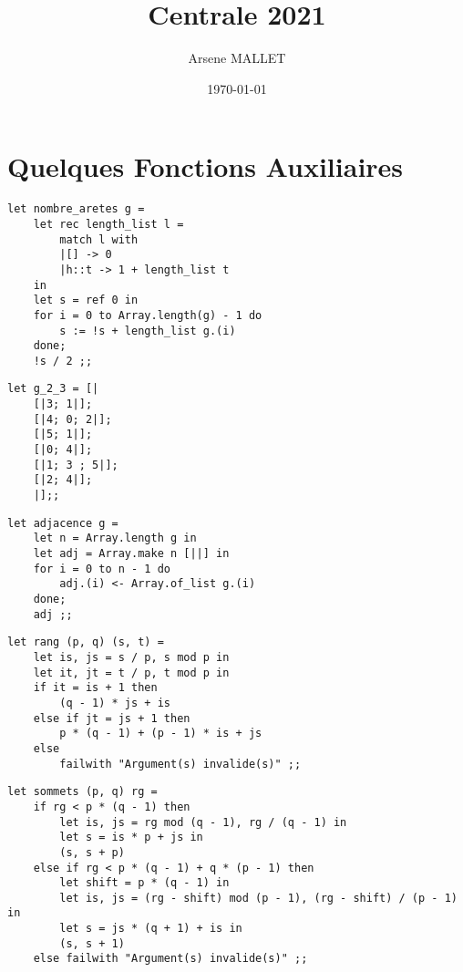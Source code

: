 \documentclass{article}
\title{Centrale 2021}
\date{\today}
\author{Arsene MALLET}
\begin{document}
\thispagestyle{firstpage}

\begin{center}
    \huge\bfseries{\@title}
\end{center}

\section{Quelques Fonctions Auxiliaires}

\begin{question}
    \item \begin{verbatim}
let nombre_aretes g =
    let rec length_list l =
        match l with
        |[] -> 0
        |h::t -> 1 + length_list t 
    in
    let s = ref 0 in
    for i = 0 to Array.length(g) - 1 do
        s := !s + length_list g.(i)
    done;
    !s / 2 ;;
    \end{verbatim}

    \item \begin{verbatim}
let g_2_3 = [|
    [|3; 1|];
    [|4; 0; 2|];
    [|5; 1|];
    [|0; 4|];
    [|1; 3 ; 5|];
    [|2; 4|];
    |];;
    \end{verbatim}

    \item \begin{verbatim}
let adjacence g =
    let n = Array.length g in
    let adj = Array.make n [||] in
    for i = 0 to n - 1 do
        adj.(i) <- Array.of_list g.(i)
    done;
    adj ;; 
    \end{verbatim}
    
    \item \begin{verbatim}
let rang (p, q) (s, t) =
    let is, js = s / p, s mod p in
    let it, jt = t / p, t mod p in
    if it = is + 1 then
        (q - 1) * js + is
    else if jt = js + 1 then
        p * (q - 1) + (p - 1) * is + js
    else 
        failwith "Argument(s) invalide(s)" ;;
    \end{verbatim}

    \item \begin{verbatim}
let sommets (p, q) rg =
    if rg < p * (q - 1) then
        let is, js = rg mod (q - 1), rg / (q - 1) in
        let s = is * p + js in
        (s, s + p)
    else if rg < p * (q - 1) + q * (p - 1) then
        let shift = p * (q - 1) in
        let is, js = (rg - shift) mod (p - 1), (rg - shift) / (p - 1) in
        let s = js * (q + 1) + is in
        (s, s + 1)
    else failwith "Argument(s) invalide(s)" ;;
    \end{verbatim}


\end{question}
\end{document}
